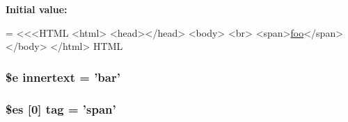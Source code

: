 {\bfseries Initial value\+:}
\begin{DoxyCode}
= <<<HTML
<html>
    <head></head>
    <body>
        <br>
        <span>\hyperlink{strip__testcase_8php_aa901575d6c772d2340f7e16cf7028985}{foo}</span>
    </body>
</html>
HTML
\end{DoxyCode}
\hypertarget{element__testcase_8php_afc42b425f411d415f2b82ae64a8bd185}{
\subsubsection[{innertext}]{\setlength{\rightskip}{0pt plus 5cm}\$e innertext = 'bar'}}\label{element__testcase_8php_afc42b425f411d415f2b82ae64a8bd185}
\hypertarget{element__testcase_8php_a18413934cd1931907ddc5ac04031be0a}{
\subsubsection[{tag}]{\setlength{\rightskip}{0pt plus 5cm}\$es \mbox{[}0\mbox{]} tag = 'span'}}\label{element__testcase_8php_a18413934cd1931907ddc5ac04031be0a}
